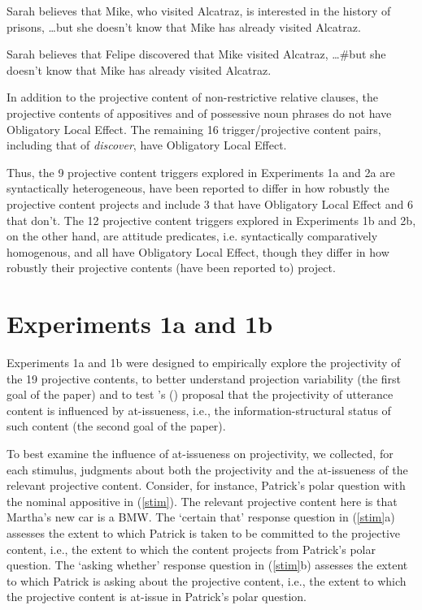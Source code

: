 \documentclass[11pt,fleqn]{article}
\newcommand{\6}{\mbox{$[\hspace*{-.6mm}[$}}
\newcommand{\9}{\mbox{$]\hspace*{-.6mm}]$}}
\newcommand{\citetpos}[1]{\citeauthor{#1}'s (\citeyear{#1})}
\begin{document}
\begin{exe}
\ex\label{ole}
\begin{xlist}
\ex Sarah believes that Mike, who visited Alcatraz, is interested in the history of prisons, \ldots but she doesn't know that Mike has already visited Alcatraz.

\ex Sarah believes that Felipe discovered that Mike visited Alcatraz, \ldots \#but she doesn't know that Mike has already visited Alcatraz. 

\end{xlist}
\end{exe}
In addition to the projective content of non-restrictive relative clauses, the projective contents of appositives and of possessive noun phrases do not have Obligatory Local Effect. The remaining 16 trigger/projective content pairs, including that of {\em discover}, have Obligatory Local Effect. 

Thus, the 9 projective content triggers explored in Experiments 1a and 2a are syntactically heterogeneous, have been reported to differ in how robustly the projective content projects and include 3 that have Obligatory Local Effect and 6 that don't. The 12 projective content triggers explored in Experiments 1b and 2b, on the other hand, are attitude predicates, i.e. syntactically comparatively homogenous, and all have Obligatory Local Effect, though they differ in how robustly their projective contents (have been reported to) project.


\section{Experiments 1a and 1b}\label{s3}

Experiments 1a and 1b were designed to empirically explore the projectivity of the 19 projective contents, to better understand projection variability (the first goal of the paper) and to test \citetpos{brst-salt10} proposal that the projectivity of utterance content is influenced by at-issueness, i.e., the information-structural status of such content (the second goal of the paper). 

To best examine the influence of at-issueness on projectivity, we collected, for each stimulus, judgments about both the projectivity and the at-issueness of the relevant projective content. Consider, for instance, Patrick's polar question with the nominal appositive in (\ref{stim}). The relevant projective content here is that Martha's new car is a BMW. The `certain that' response question in (\ref{stim}a) assesses the extent to which Patrick is taken to be committed to the projective content, i.e., the extent to which the content projects from Patrick's polar question. The `asking whether' response question in (\ref{stim}b) assesses the extent to which Patrick is asking about the projective content, i.e., the extent to which the projective content is at-issue in Patrick's polar question. 
\end{document}
